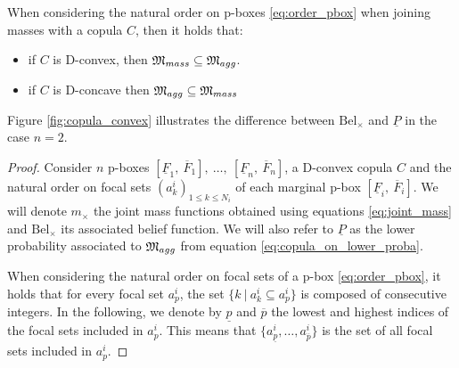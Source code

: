 \begin{proposition}\label{prop:convexity_pbox}
    When considering the natural order on p-boxes \eqref{eq:order_pbox} when joining masses with a copula $C$, then it holds that:
    \begin{itemize}
        \item if $C$ is D-convex, then ${\mathfrak{M}}_{mass}\subseteq {\mathfrak{M}}_{agg}$.
        \item if $C$ is D-concave then ${\mathfrak{M}}_{agg}\subseteq{\mathfrak{M}}_{mass}$ 
    \end{itemize}
\end{proposition}
Figure \ref{fig:copula_convex} illustrates the difference between $\mathrm{Bel}_\times$ and $\underline{P}$ in the case $n=2$.
\begin{proof}
    Consider $n$ p-boxes $[\underline{F}_1,~\overline{F}_1],~\dots,~[\underline{F}_n,~\overline{F}_n]$, a D-convex copula $C$ and the natural order on focal sets $(a^i_k)_{1\leqslant k \leqslant N_i}$ of each marginal p-box $[\underline{F}_i,~\overline{F}_i]$. We will denote $m_\times$ the joint mass functions obtained using equations \eqref{eq:joint_mass} and $\mathrm{Bel}_\times$ its associated belief function. We will also refer to $\underline{P}$ as the lower probability associated to ${\mathfrak{M}}_{agg}$ from equation \eqref{eq:copula_on_lower_proba}.

    When considering the natural order on focal sets of a p-box \eqref{eq:order_pbox}, it holds that for every focal set $a^i_p$, the set $\{k~|~a^i_k\subseteq a^i_p\}$ is composed of consecutive integers. In the following, we denote by $\underline{p}$ and $\overline{p}$ the lowest and highest indices of the focal sets included in $a^i_p$. This means that $\{a^i_{\underline{p}}, \dots, a^i_{\overline{p}}\}$ is the set of all focal sets included in $a^i_p$. 


\end{proof}

